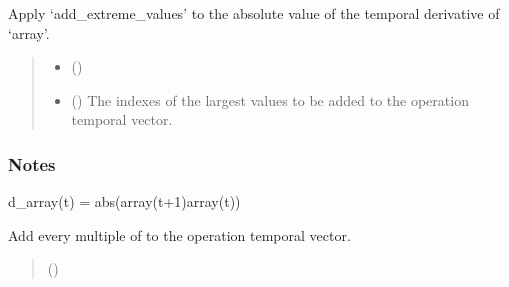 \documentclass[letterpaper,10pt,english]{sphinxmanual}
\begin{document}
\begin{fulllineitems}
\begin{fulllineitems}
\label{\detokenize{generated/tamos.TimeSettings:tamos.TimeSettings.add_large_diff}}
\pysigstartsignatures
{}
\pysigstopsignatures
\sphinxAtStartPar
Apply ‘add\_extreme\_values’ to the absolute value of the temporal derivative of ‘array’.
\begin{quote}\begin{description}
\begin{itemize}
\item {} 
\sphinxAtStartPar
{} () \textendash{} 

\item {} 
\sphinxAtStartPar
{} () \textendash{} The indexes of the  largest values to be added to the operation temporal vector.

\end{itemize}

\end{description}\end{quote}
\subsubsection*{Notes}
\begin{description}
\sphinxAtStartPar
d\_array(t) = abs(array(t+1)\sphinxhyphen{}array(t))

\end{description}

\end{fulllineitems}


\begin{fulllineitems}
\label{\detokenize{generated/tamos.TimeSettings:tamos.TimeSettings.add_regular}}
\pysigstartsignatures
{}
\pysigstopsignatures
\sphinxAtStartPar
Add every multiple of  to the operation temporal vector.
\begin{quote}\begin{description}
\sphinxAtStartPar
{} () \textendash{} 


\end{description}
\end{quote}
\end{fulllineitems}
\end{fulllineitems}
\end{document}

